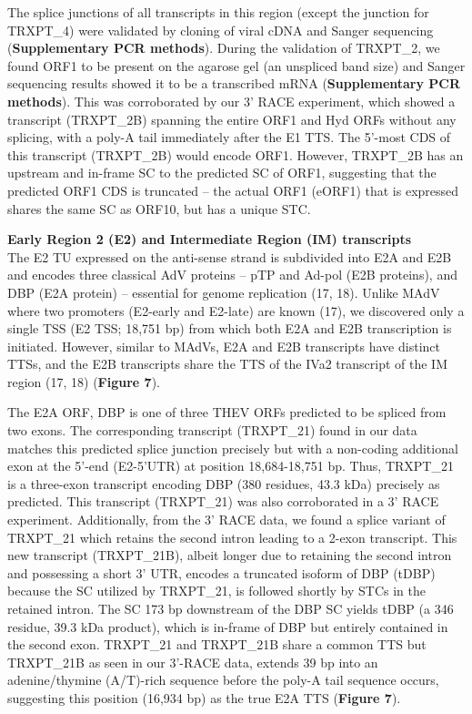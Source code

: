 \documentclass[
]{article}
\begin{document}
The splice junctions of all transcripts in this region (except the
junction for TRXPT\_4) were validated by cloning of viral cDNA and
Sanger sequencing (\textbf{Supplementary PCR methods}). During the
validation of TRXPT\_2, we found ORF1 to be present on the agarose gel
(an unspliced band size) and Sanger sequencing results showed it to be a
transcribed mRNA (\textbf{Supplementary PCR methods}). This was
corroborated by our 3' RACE experiment, which showed a transcript
(TRXPT\_2B) spanning the entire ORF1 and Hyd ORFs without any splicing,
with a poly-A tail immediately after the E1 TTS. The 5'-most CDS of this
transcript (TRXPT\_2B) would encode ORF1. However, TRXPT\_2B has an
upstream and in-frame SC to the predicted SC of ORF1, suggesting that
the predicted ORF1 CDS is truncated -- the actual ORF1 (eORF1) that is
expressed shares the same SC as ORF10, but has a unique STC.

\textbf{Early Region 2 (E2) and Intermediate Region (IM) transcripts}\\
The E2 TU expressed on the anti-sense strand is subdivided into E2A and
E2B and encodes three classical AdV proteins -- pTP and Ad-pol (E2B
proteins), and DBP (E2A protein) -- essential for genome replication
(17, 18). Unlike MAdV where two promoters (E2-early and E2-late) are
known (17), we discovered only a single TSS (E2 TSS; 18,751 bp) from
which both E2A and E2B transcription is initiated. However, similar to
MAdVs, E2A and E2B transcripts have distinct TTSs, and the E2B
transcripts share the TTS of the IVa2 transcript of the IM region (17,
18) (\textbf{Figure 7}).

The E2A ORF, DBP is one of three THEV ORFs predicted to be spliced from
two exons. The corresponding transcript (TRXPT\_21) found in our data
matches this predicted splice junction precisely but with a non-coding
additional exon at the 5'-end (E2-5'UTR) at position 18,684-18,751 bp.
Thus, TRXPT\_21 is a three-exon transcript encoding DBP (380 residues,
43.3 kDa) precisely as predicted. This transcript (TRXPT\_21) was also
corroborated in a 3' RACE experiment. Additionally, from the 3' RACE
data, we found a splice variant of TRXPT\_21 which retains the second
intron leading to a 2-exon transcript. This new transcript (TRXPT\_21B),
albeit longer due to retaining the second intron and possessing a short
3' UTR, encodes a truncated isoform of DBP (tDBP) because the SC
utilized by TRXPT\_21, is followed shortly by STCs in the retained
intron. The SC 173 bp downstream of the DBP SC yields tDBP (a 346
residue, 39.3 kDa product), which is in-frame of DBP but entirely
contained in the second exon. TRXPT\_21 and TRXPT\_21B share a common
TTS but TRXPT\_21B as seen in our 3'-RACE data, extends 39 bp into an
adenine/thymine (A/T)-rich sequence before the poly-A tail sequence
occurs, suggesting this position (16,934 bp) as the true E2A TTS
(\textbf{Figure 7}).
\end{document}
